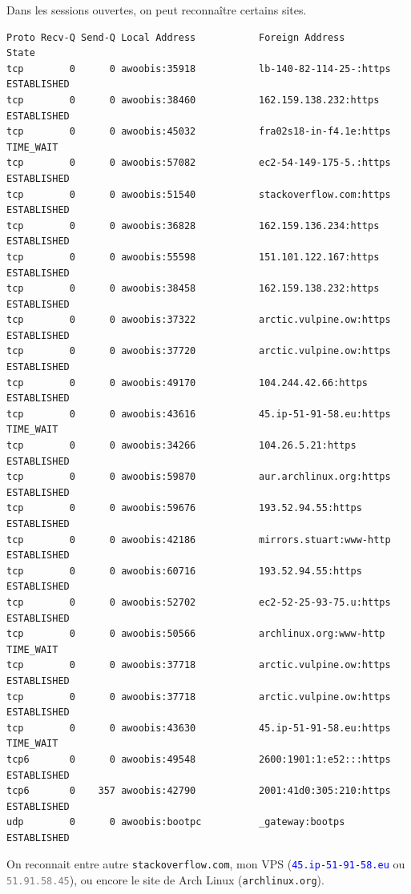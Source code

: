 \documentclass[a4paper,10pt]{article}
\newcommand{\blackword}[1]{\texttt{#1}}
\newcommand{\codeword}[1]{\texttt{\textcolor{gray}{#1}}}
\newcommand{\blueword}[1]{\texttt{\textcolor{blue}{#1}}}
\begin{document}
Dans les sessions ouvertes, on peut reconnaître certains sites.

\begin{lstlisting}[basicstyle=\small]
Proto Recv-Q Send-Q Local Address           Foreign Address         State          
tcp        0      0 awoobis:35918           lb-140-82-114-25-:https ESTABLISHED    
tcp        0      0 awoobis:38460           162.159.138.232:https   ESTABLISHED    
tcp        0      0 awoobis:45032           fra02s18-in-f4.1e:https TIME_WAIT      
tcp        0      0 awoobis:57082           ec2-54-149-175-5.:https ESTABLISHED    
tcp        0      0 awoobis:51540           stackoverflow.com:https ESTABLISHED    
tcp        0      0 awoobis:36828           162.159.136.234:https   ESTABLISHED    
tcp        0      0 awoobis:55598           151.101.122.167:https   ESTABLISHED    
tcp        0      0 awoobis:38458           162.159.138.232:https   ESTABLISHED    
tcp        0      0 awoobis:37322           arctic.vulpine.ow:https ESTABLISHED    
tcp        0      0 awoobis:37720           arctic.vulpine.ow:https ESTABLISHED    
tcp        0      0 awoobis:49170           104.244.42.66:https     ESTABLISHED    
tcp        0      0 awoobis:43616           45.ip-51-91-58.eu:https TIME_WAIT      
tcp        0      0 awoobis:34266           104.26.5.21:https       ESTABLISHED    
tcp        0      0 awoobis:59870           aur.archlinux.org:https ESTABLISHED    
tcp        0      0 awoobis:59676           193.52.94.55:https      ESTABLISHED    
tcp        0      0 awoobis:42186           mirrors.stuart:www-http ESTABLISHED    
tcp        0      0 awoobis:60716           193.52.94.55:https      ESTABLISHED    
tcp        0      0 awoobis:52702           ec2-52-25-93-75.u:https ESTABLISHED    
tcp        0      0 awoobis:50566           archlinux.org:www-http  TIME_WAIT      
tcp        0      0 awoobis:37718           arctic.vulpine.ow:https ESTABLISHED    
tcp        0      0 awoobis:37718           arctic.vulpine.ow:https ESTABLISHED    
tcp        0      0 awoobis:43630           45.ip-51-91-58.eu:https TIME_WAIT      
tcp6       0      0 awoobis:49548           2600:1901:1:e52:::https ESTABLISHED    
tcp6       0    357 awoobis:42790           2001:41d0:305:210:https ESTABLISHED    
udp        0      0 awoobis:bootpc          _gateway:bootps         ESTABLISHED
\end{lstlisting}

On reconnait entre autre \blackword{stackoverflow.com}, mon VPS (\blueword{45.ip-51-91-58.eu} ou \codeword{51.91.58.45}), ou encore le site de Arch Linux (\blackword{archlinux.org}).
\end{document}
